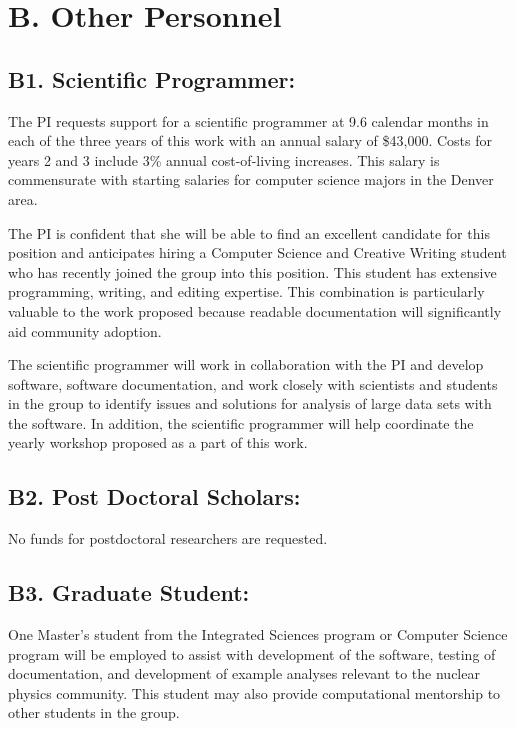 \documentclass[11pt,oneside]{memoir}
\begin{document}
\section*{B. Other Personnel}

\subsection*{B1. Scientific Programmer:}
The PI requests support for a scientific programmer at 9.6 calendar months in each of the three years of this work with an annual salary of \$43,000. Costs for years 2 and 3 include 3\% annual  cost-of-living increases.  This salary is commensurate with starting salaries for computer science majors in the Denver area.

The PI is confident that she will be able to find an excellent candidate for this position and anticipates hiring a Computer Science and Creative Writing student who has recently joined the group into this position.  This student has extensive programming, writing, and editing expertise.  This combination is  particularly valuable to the work proposed because readable documentation will significantly aid community adoption.

The scientific programmer will work in collaboration with the PI and develop software, software documentation, and work closely with scientists and students in the group to identify issues and solutions for analysis of large data sets with the software.  In addition, the scientific programmer will help coordinate the yearly workshop proposed as a part of this work.


\subsection{B2.  Post Doctoral Scholars:}

No funds for postdoctoral researchers are requested.


\subsection[B3]{B3. Graduate Student:} 
\label{sec:masters-student-salary}
One Master's student from the Integrated Sciences program or Computer Science program will be employed to assist with development of the software, testing of documentation, and development of example analyses relevant to the nuclear physics community.  This student may also provide computational mentorship to other students in the group.  
\end{document}
